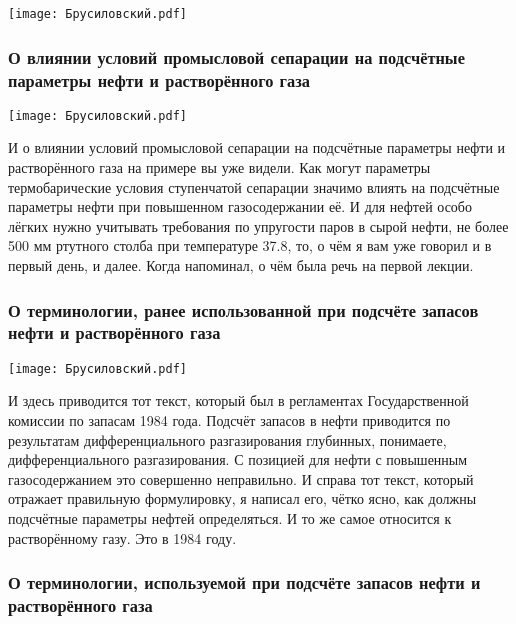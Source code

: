\documentclass[main.tex]{subfiles}
\begin{document}
\begin{center}
\texttt{[image: Брусиловский.pdf]}
\end{center}



\subsubsection{О влиянии условий промысловой сепарации на подсчётные параметры нефти и растворённого газа}

\begin{center}
\texttt{[image: Брусиловский.pdf]}
\end{center}

И о влиянии условий промысловой сепарации на подсчётные параметры нефти и растворённого газа на примере вы уже видели.
Как могут параметры термобарические условия ступенчатой сепарации значимо влиять на подсчётные параметры нефти при повышенном газосодержании её.
И для нефтей особо лёгких нужно учитывать требования по упругости паров в сырой нефти, не более 500 мм ртутного столба при температуре 37.8, то, о чём я вам уже говорил и в первый день, и далее.
Когда напоминал, о чём была речь на первой лекции.

\subsubsection{О терминологии, ранее использованной при подсчёте запасов нефти и растворённого газа}

\begin{center}
\texttt{[image: Брусиловский.pdf]}
\end{center}

И здесь приводится тот текст, который был в регламентах Государственной комиссии по запасам 1984 года.
Подсчёт запасов в нефти приводится по результатам дифференциального разгазирования глубинных, понимаете, дифференциального разгазирования.
С позицией для нефти с повышенным газосодержанием это совершенно неправильно.
И справа тот текст, который отражает правильную формулировку, я написал его, чётко ясно, как должны подсчётные параметры нефтей определяться.
И то же самое относится к растворённому газу.
Это в 1984 году.

\subsubsection{О терминологии, используемой при подсчёте запасов нефти и растворённого газа}
\end{document}
